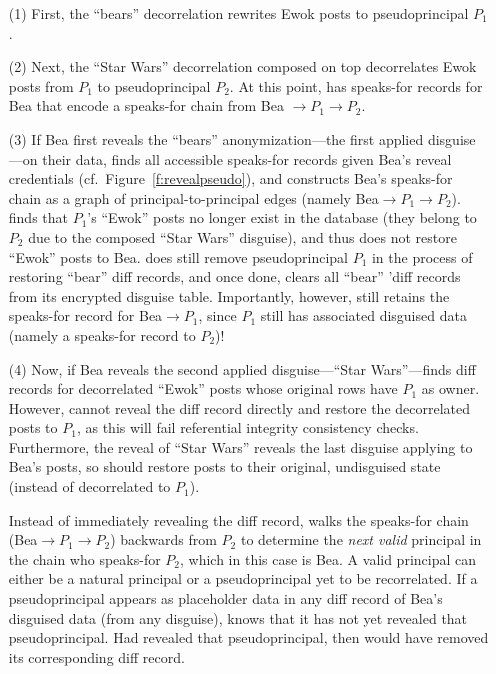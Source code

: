 %
\begin{enumerate}
    \item[(1)] First, the ``bears''
decorrelation rewrites Ewok posts to pseudoprincipal $P_1$.
%
\item[(2)] Next, the ``Star
Wars'' decorrelation composed on top decorrelates Ewok posts from $P_1$ to
pseudoprincipal $P_2$.  At this point, \sys has speaks-for records for Bea that
encode a speaks-for chain from Bea $\to P_1 \to P_2$.
%
\item[(3)] If Bea first reveals the ``bears'' anonymization---the first applied
disguise---on their data, \sys finds all accessible speaks-for records given
Bea's reveal credentials (cf.\ Figure~\ref{f:revealpseudo}), and constructs Bea's
speaks-for chain as a graph of principal-to-principal edges (namely Bea$\to
P_1\to P_2$).
%
\sys finds that $P_1$'s ``Ewok'' posts no longer exist in the database (they belong to
$P_2$ due to the composed ``Star Wars'' disguise), and thus does not restore 
``Ewok'' posts to Bea. \sys does still remove pseudoprincipal $P_1$ in the process
of restoring ``bear'' diff records, and once done, clears all ``bear'' 'diff
records from its encrypted disguise table. 
%
Importantly, however, \sys still retains the speaks-for record for Bea$\to P_1$,
since $P_1$ still has associated disguised data (namely a speaks-for record to $P_2$)!
%
\item[(4)] Now, if Bea reveals the second applied disguise---``Star Wars''---\sys finds
diff records for decorrelated ``Ewok'' posts whose original rows have $P_1$ as
owner. 
%
However, \sys cannot reveal the diff record directly and restore the
        decorrelated posts to $P_1$, as this will fail referential integrity
        consistency checks. Furthermore, the reveal of ``Star Wars'' reveals the
        last disguise applying to Bea's posts, so \sys should restore posts to
        their original, undisguised state (instead of decorrelated to $P_1$).


        Instead of immediately revealing the diff record, \sys walks the
        speaks-for chain (Bea$\to P_1 \to P_2$) backwards from $P_2$ to
        determine the \emph{next valid} principal in the chain who speaks-for $P_2$,
        which in this case is Bea.
        A valid principal can either be a natural principal or a pseudoprincipal
        yet to be recorrelated. If a pseudoprincipal appears as placeholder data
        in any diff record of Bea's disguised data (from any disguise), \sys
        knows that it has not yet revealed that pseudoprincipal. Had \sys
        revealed that pseudoprincipal, then \sys would have removed its
        corresponding diff
        record.


\end{enumerate}
